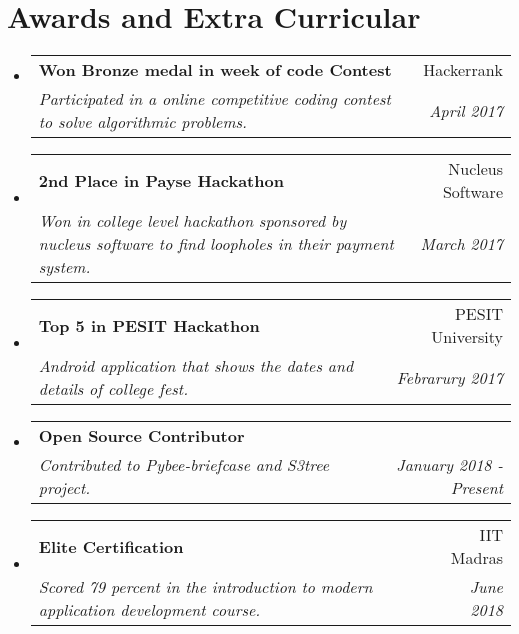 \documentclass[letterpaper,11pt]{article}
\makeatletter
\newcommand{\resumeSubheading}[4]{
  \vspace{-1pt}\item
    \begin{tabular*}{0.97\textwidth}{l@{\extracolsep{\fill}}r}
      \textbf{#1} & #2 \\
      \textit{\small#3} & \textit{\small #4} \\
    \end{tabular*}\vspace{-5pt}
}
\newcommand{\resumeSubHeadingListStart}{\begin{itemize}[leftmargin=*]}
\newcommand{\resumeSubHeadingListEnd}{\end{itemize}}
\makeatother
\begin{document}
\section{Awards and Extra Curricular}
  \resumeSubHeadingListStart
    \resumeSubheading
        {Won Bronze medal in week of code Contest}{Hackerrank}
        {Participated in a online competitive coding contest to solve algorithmic problems.}{April 2017}
    \resumeSubheading
        {2nd Place in Payse Hackathon}{Nucleus Software}
        {Won in college level hackathon sponsored by nucleus software to find loopholes in their payment system.}{March 2017}
    \resumeSubheading
        {Top 5 in PESIT Hackathon}{PESIT University}
        {Android application that shows the dates and details of college fest.}{Febrarury 2017}
    \resumeSubheading
        {Open Source Contributor}{}
        {Contributed to Pybee-briefcase and S3tree project.}{January 2018 - Present}
    \resumeSubheading
        {Elite Certification}{IIT Madras}
        {Scored 79 percent in the introduction to modern application development course.}{June 2018}
  \resumeSubHeadingListEnd
\end{document}
